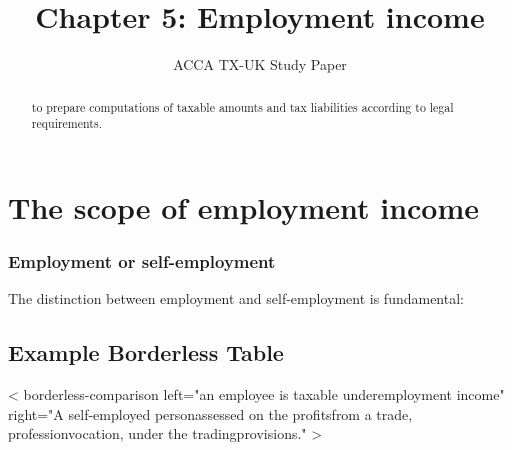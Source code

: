 \documentclass[
  a4paper,
  DIV=11,
  numbers=noendperiod]{scrartcl}
\title{Chapter 5: Employment income}
\subtitle{ACCA TX-UK Study Paper}
\author{}
\date{}
\renewcommand*\contentsname{Table of contents}
\newcommand\contentsname{Table of contents}
\begin{document}
\maketitle
\begin{abstract}
to prepare computations of taxable amounts and tax liabilities according
to legal requirements.
\end{abstract}

\renewcommand*\contentsname{Table of contents}
{
\setcounter{tocdepth}{3}
\tableofcontents
}

\section{The scope of employment
income}\label{the-scope-of-employment-income}

\subsubsection{Employment or
self-employment}\label{employment-or-self-employment}

The distinction between employment and self-employment is fundamental:

\subsection{Example Borderless Table}\label{example-borderless-table}

{{< borderless-comparison    left="an employee is taxable under\nthe employment income\nprovisions"   right="A self-employed person\nis assessed on the profits\nderived from a trade, profession\nor vocation, under the trading\nincome provisions." >}}
\end{document}
